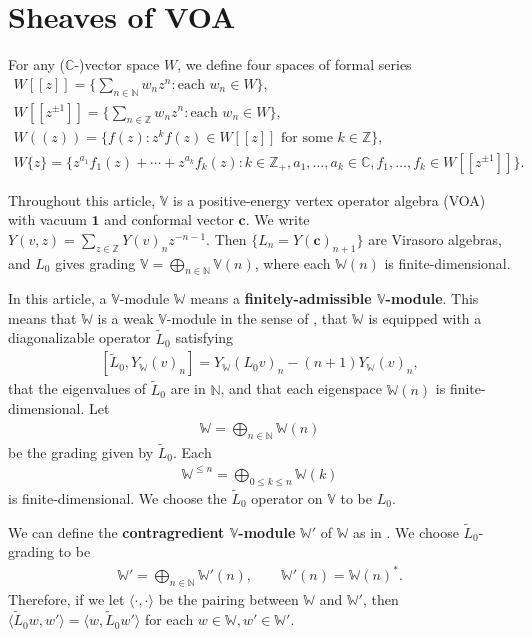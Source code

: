 \documentclass[12pt,a4paper,notitlepage]{article}
\theoremstyle{definition}
\theoremstyle{plain}
\newcommand{\wtd}{\widetilde}
\newcommand{\id}{\mathbf{1}}
\newcommand{\bk}[1]{\langle {#1}\rangle}
\newcommand{\mbb}{\mathbb}
\newcommand{\Vbb}{\mathbb V}
\newcommand{\Wbb}{\mathbb W}
\newcommand{\Cbb}{\mathbb C}
\newcommand{\Nbb}{\mathbb N}
\newcommand{\Zbb}{\mathbb Z}
\newcommand{\cbf}{\mathbf c}
\numberwithin{equation}{section}
\begin{document}
\section{Sheaves of VOA}\label{lb1}


For any ($\Cbb$-)vector space $W$, we define four spaces of formal series 
\begin{gather*}
W[[z]]=\bigg\{\sum_{n\in\mathbb N}w_nz^n:\text{each }w_n\in W\bigg\},\\
W[[z^{\pm 1}]]=\bigg\{\sum_{n\in\mathbb Z}w_nz^n:\text{each }w_n\in W\bigg\},\\
W((z))=\Big\{f(z):z^kf(z)\in W[[z]]\text{ for some }k\in\mbb Z \Big\},\\
W\{z\}=\Big\{z^{a_1}f_1(z)+\cdots+z^{a_k}f_k(z):k\in\Zbb_+,a_1,\dots,a_k\in\Cbb,f_1,\dots,f_k\in W[[z^{\pm 1}]]\Big\}.
\end{gather*}


Throughout this article, $\Vbb$ is a positive-energy vertex operator algebra (VOA) with vacuum $\id$ and conformal vector $\cbf$. We write $Y(v,z)=\sum_{z\in\Zbb}Y(v)_nz^{-n-1}$. Then $\{L_n=Y(\cbf)_{n+1}\}$ are Virasoro algebras, and $L_0$ gives grading $\Vbb=\bigoplus_{n\in\Nbb}\Vbb(n)$, where each $\Wbb(n)$ is finite-dimensional. 

In this article,  a $\Vbb$-module $\Wbb$ means a \textbf{finitely-admissible $\Vbb$-module}. This means that $\Wbb$ is a weak $\Vbb$-module in the sense of \cite{DLM97}, that $\Wbb$ is equipped with a diagonalizable operator $\wtd L_0$ satisfying \index{L0@$\wtd L_0$}  
\begin{align}\label{eq34}
[\wtd L_0,Y_\Wbb(v)_n]=Y_\Wbb(L_0 v)_n-(n+1)Y_\Wbb(v)_n,	
\end{align}
that the eigenvalues of $\wtd L_0$ are in $\Nbb$, and that each eigenspace $\Wbb(n)$ is finite-dimensional. Let \index{W@$\Wbb(n),\Wbb_{(n)}$}
\begin{align*}
	\Wbb=\bigoplus_{n\in\Nbb}\Wbb(n)	
\end{align*}
be the grading given by $\wtd L_0$. Each
\begin{align*}
	\Wbb^{\leq n}=\bigoplus_{0\leq k\leq n}	\Wbb{(k)}
\end{align*}
is finite-dimensional. We choose  the $\wtd L_0$ operator on $\Vbb$ to be $L_0$.

We can define the \textbf{contragredient $\Vbb$-module} $\Wbb'$ of $\Wbb$ as in \cite{FHL93}. We choose $\wtd L_0$-grading to be
\begin{align*}
\Wbb'=	\bigoplus_{n\in\Nbb}\Wbb'{(n)},\qquad \Wbb'{(n)}=\Wbb{(n)}^*.
\end{align*}
Therefore, if we let $\bk{\cdot,\cdot}$ be the pairing between $\Wbb$ and $\Wbb'$, then $\bk{\wtd L_0 w,w'}=\bk{w,\wtd L_0 w'}$ for each $w\in\Wbb,w'\in\Wbb'$.
\end{document}

